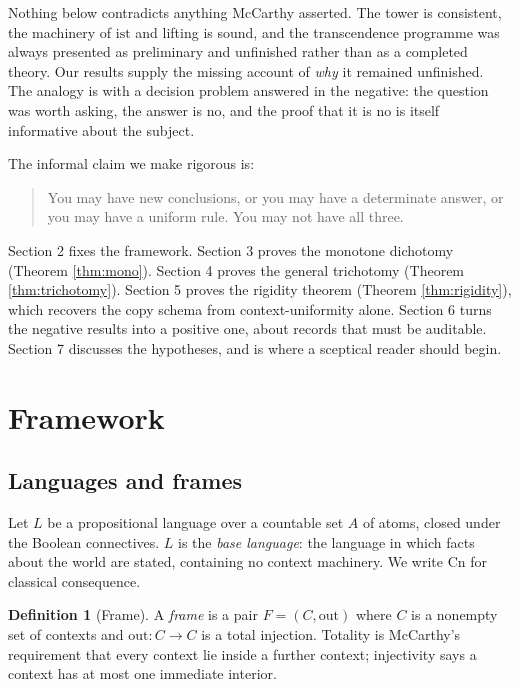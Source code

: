 \documentclass[11pt]{article}
\theoremstyle{plain}
\theoremstyle{definition}
\newtheorem{definition}[theorem]{Definition}
\theoremstyle{remark}
\newcommand{\ist}{\mathrm{ist}}
\newcommand{\Cn}{\mathrm{Cn}}
\newcommand{\out}{\mathrm{out}}
\begin{document}
Nothing below contradicts anything McCarthy asserted. The tower is consistent,
the machinery of $\ist$ and lifting is sound, and the transcendence programme was
always presented as preliminary and unfinished rather than as a completed
theory. Our results supply the missing account of \emph{why} it remained
unfinished. The analogy is with a decision problem answered in the negative: the
question was worth asking, the answer is no, and the proof that it is no is
itself informative about the subject.

The informal claim we make rigorous is:

\begin{quote}
You may have new conclusions, or you may have a determinate answer, or you may
have a uniform rule. You may not have all three.
\end{quote}

Section 2 fixes the framework. Section 3 proves the monotone dichotomy
(Theorem \ref{thm:mono}). Section 4 proves the general trichotomy
(Theorem \ref{thm:trichotomy}). Section 5 proves the rigidity theorem
(Theorem \ref{thm:rigidity}), which recovers the copy schema from
context-uniformity alone. Section 6 turns the negative results into a positive
one, about records that must be auditable. Section 7 discusses the hypotheses,
and is where a sceptical reader should begin.

\section{Framework}

\subsection{Languages and frames}

Let $L$ be a propositional language over a countable set $A$ of atoms, closed
under the Boolean connectives. $L$ is the \emph{base language}: the language in
which facts about the world are stated, containing no context machinery. We
write $\Cn$ for classical consequence.

\begin{definition}[Frame]
A \emph{frame} is a pair $F=(C,\out)$ where $C$ is a nonempty set of contexts and
$\out\colon C \to C$ is a total injection. Totality is McCarthy's requirement
that every context lie inside a further context; injectivity says a context has
at most one immediate interior.
\end{definition}
\end{document}
